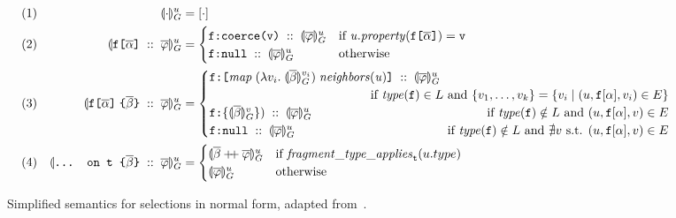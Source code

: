 \begin{figure*}[t]
    \centering
    \begin{align*}
    & (1) & \seval{\cdot}{u} &= [\cdot] \\
    & (2) & \sevalu{\fld\; ::\; \queries} &= 
    \begin{cases}
      \resp{\texttt{coerce(\val)}} \; ::\; \sevalu{\queries}  
      & \text{if }\mathit{u.property}(\fld) = \val \\
      \resp{\nval} \; :: \; \sevalu{\queries} 
      & \text{otherwise}
    \end{cases}\\
    & (3) & %
    \sevalu{\nfld{\overline{\beta}} \; ::\; \queries} &=
    \begin{cases}
      \resp{\texttt{[} \mathit{map}\; (\lambda v_{i}.\; \seval{\overline{\beta}}{v_{i}})\; 
      \mathit{neighbors(u)} \texttt{]}} \; :: \; \sevalu{\queries}  \\
      \hfill \text{ if } 
        \mathit{type(\fkey)} \in L
          \text{ and } \{v_{1}, \ldots, v_{k}\} = \{v_{i} \mid (u, \fkey[\alpha], 
        v_{i}) \in E\} \\
      \resp{\{\seval{\subqueries{\beta}}{v}\})} \; :: \; \sevalu{\queries}  
      \hfill \text{ if } 
        \mathit{type(\fkey)} \notin L
        \text{ and } (u, \fkey[\alpha], v) \in E \\
      \resp{\nval} \; :: \; \sevalu{\queries} 
      \qquad \qquad \qquad \qquad \qquad \qquad
      \text{ if } \mathit{type(\fkey)} \notin L
        \text{ and } \nexists v \text{ s.t. } (u, \fkey[\alpha], v) \in E \\
    \end{cases}\\
    & (4) & \sevalu{\ifrag{t}{\overline{\beta}}\; ::\; \queries} &= \begin{cases}
    \sevalu{\overline{\beta} \mdoubleplus \queries} & 
    \text{if }\mathit{fragment\_type\_applies}_{\texttt{t}}(u.type)\\
    \sevalu{\queries} & \text{otherwise}
    \end{cases}
    \end{align*}
    \caption{Simplified semantics for selections in normal form, adapted from~\cite{gqlph}. } %
    \label{fig:simpl_semantics}
\end{figure*}

